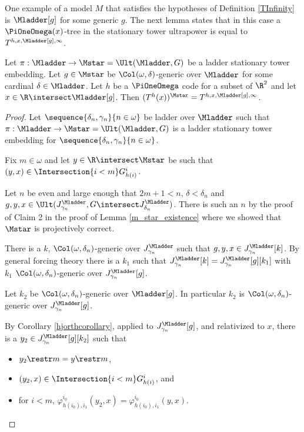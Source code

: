 \documentclass[oneside,12pt]{amsart}
\begin{document}
One example of a model $M$ that satisfies the hypotheses of Definition \ref{TInfinity} is
$\Mladder[g]$ for some generic $g$. The next lemma states that in this case
a $\PiOneOmega(x)$-tree in the stationary tower ultrapower is equal to
$T^{h,x,\Mladder[g],\infty}$.

\begin{lemma}
\label{TStarIsTInfinity}
Let $\pi:\Mladder\to\Mstar=\Ult(\Mladder,G)$ be a ladder stationary tower embedding.
Let $g\in\Mstar$ be $\Col(\omega,\delta)$-generic over $\Mladder$ for some cardinal $\delta\in\Mladder$.
Let $h$ be a $\PiOneOmega$ code for a subset
of $\R^2$ and let $x\in\R\intersect \Mladder[g]$.
Then $(T^h(x))^{\Mstar} = T^{h,x,\Mladder[g],\infty}$.
\end{lemma}
\begin{proof}
Let $\sequence{\delta_n,\gamma_n}{n\in\omega}$ be  ladder over $\Mladder$ such that
$\pi:\Mladder\to\Mstar=\Ult(\Mladder,G)$ is a ladder stationary tower embedding for $\sequence{\delta_n,\gamma_n}{n\in\omega}$.

Fix $m\in\omega$ and let  $y\in\R\intersect\Mstar$ be such that
$(y,x)\in \Intersection{i<m} G^i_{h(i)}$.

Let $n$ be even and large enough that $2m+1 < n$, $\delta < \delta_n$ and $g,y,x\in \Ult(J^{\Mladder}_{\gamma_n},G\intersect J^{\Mladder}_{\delta_n})$.
There is such an $n$ by the proof of Claim 2 in the proof of Lemma \ref{m_star_existence} where we showed that $\Mstar$ is projectively correct.

There is a $k$, $\Col(\omega,\delta_n)$-generic over $J^{\Mladder}_{\gamma_n}$ such that $g,y,x\in J^{\Mladder}_{\gamma_n}[k]$.
By general forcing theory there is a $k_1$ such that $J^{\Mladder}_{\gamma_n}[k]=J^{\Mladder}_{\gamma_n}[g][k_1]$ with $k_1$
$\Col(\omega,\delta_n)$-generic over $J^{\Mladder}_{\gamma_n}[g]$.

Let $k_2$ be
$\Col(\omega,\delta_n)$-generic over $\Mladder[g]$. In particular $k_2$ is
$\Col(\omega,\delta_n)$-generic over $J^{\Mladder}_{\gamma_n}[g]$.

By Corollary \ref{hjorthcorollary}, applied to $J^{\Mladder}_{\gamma_n}[g]$, and relativized to $x$,
there is a $y_2\in J^{\Mladder}_{\gamma_n}[g][k_2]$ such that
\begin{itemize}
\item $y_2 \restr m = y \restr m$,
\item $(y_2,x)\in \Intersection{i<m} G^i_{h(i)}$, and
\item for $i<m$, $\varphi^{i_0}_{h(i_0),i_1}(y_2,x) = \varphi^{i_0}_{h(i_0),i_1}(y,x)$.
\end{itemize}


\end{proof}
\end{document}
